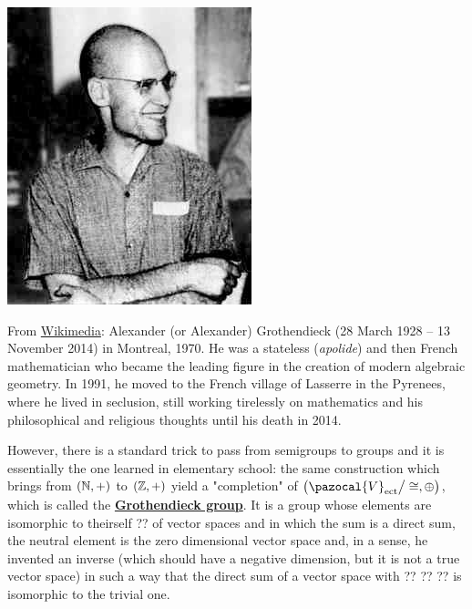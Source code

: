 \documentclass[../main.tex]{subfiles}
\begin{document}
\begin{marginfigure}[-10mm]
	\includegraphics[width=1\linewidth]{images/Alexander_Grothendieck.jpg}
	\caption[Photo of Alexander Grothendieck]{From \href{https://commons.wikimedia.org/wiki/File:Alexander_Grothendieck.jpg}{Wikimedia}: Alexander (or Alexander) Grothendieck (28 March 1928 – 13 November 2014) in Montreal, 1970. He was a stateless (\textit{apolide}) and then French mathematician who became the leading figure in the creation of modern algebraic geometry. In 1991, he moved to the French village of Lasserre in the Pyrenees, where he lived in seclusion, still working tirelessly on mathematics and his philosophical and religious thoughts until his death in 2014.}
\end{marginfigure}
However, there is a standard trick to pass from semigroups to groups and it is essentially the one learned in elementary school: the same construction which brings from $\pqty{\mathbb{N},+}$ to $\pqty{\mathbb{Z},+}$ yield a "completion" of $\pqty{\pazocal{V}_{\textrm{ect}}\big/\cong, \oplus}$, which is called the \textbf{\href{https://it.wikipedia.org/wiki/Gruppo_di_Grothendieck}{Grothendieck group}}.
It is a group whose elements are isomorphic to theirself ?? of vector spaces and in which the sum is a direct sum, the neutral element is the zero dimensional vector space and, in a sense, he invented an inverse (which should have a negative dimension, but it is not a true vector space) in such a way that the direct sum of a vector space with ?? ?? ?? is isomorphic to the trivial one.
\end{document}

